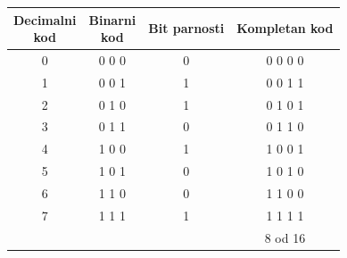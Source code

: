 \begin{tabular}{cccc}\toprule\shortstack{Decimalni\\kod} & \shortstack{Binarni\\kod} & Bit parnosti & Kompletan kod\\\midrule
0 & 0 0 0 & 0 & 0 0 0 0\\
1 & 0 0 1 & 1 & 0 0 1 1\\
2 & 0 1 0 & 1 & 0 1 0 1\\
3 & 0 1 1 & 0 & 0 1 1 0\\
4 & 1 0 0 & 1 & 1 0 0 1\\
5 & 1 0 1 & 0 & 1 0 1 0\\
6 & 1 1 0 & 0 & 1 1 0 0\\
7 & 1 1 1 & 1 & 1 1 1 1\\
\bottomrule &&&8 od 16\end{tabular}
